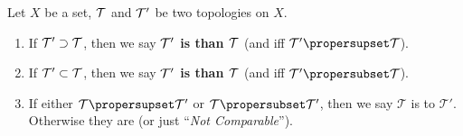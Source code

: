 \begin{defn}
  Let $X$ be a set, $\mathcal{T}$ and $\mathcal{T'}$ be two
  topologies on $X$.
  \begin{enumerate}
  \item If $\mathcal{T'}\supset\mathcal{T}$, then we say
    \textbf{$\mathcal{T'}$ is  than $\mathcal{T}$}
    (and  iff
    $\topology{T'}\propersupset\topology{T}$).
  \item If $\mathcal{T'}\subset\mathcal{T}$, then we say
    \textbf{$\mathcal{T'}$ is  than $\mathcal{T}$}
    (and  iff
    $\topology{T'}\propersubset\topology{T}$).
  \item If either $\mathcal{T}\propersupset\mathcal{T'}$ or
    $\mathcal{T}\propersubset\mathcal{T'}$, then we say $\mathcal{T}$ is
     to $\mathcal{T'}$. Otherwise they are
     (or just ``\emph{Not Comparable}'').
  \end{enumerate}
\end{defn}

